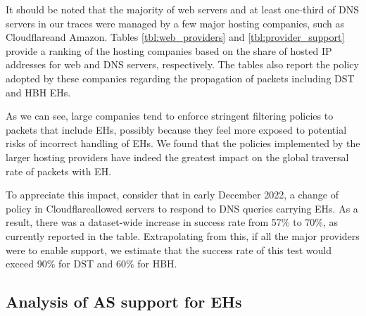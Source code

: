 \documentclass[conference]{IEEEtran}
\begin{document}

It should be noted that the  majority of web servers and at least one-third of
DNS servers in our traces were managed by a few major hosting companies, such
as Cloudflare\texttrademark and Amazon\texttrademark.  Tables
\ref{tbl:web_providers} and \ref{tbl:provider_support} provide a ranking of the
hosting companies based on the share of hosted IP addresses for web and DNS
servers, respectively. The tables also report the policy adopted by these
companies regarding the propagation of packets including DST and HBH EHs.  

As we can see, large companies tend to enforce stringent filtering policies to
packets that include EHs, possibly because they feel more exposed to potential
risks of incorrect handling of EHs.  We found that the policies implemented by
the larger hosting providers have indeed the greatest impact on the global
traversal rate of packets with EH. 



To appreciate this impact, consider that in early December 2022, a change of
policy in Cloudflare\texttrademark allowed servers to respond to DNS queries
carrying EHs.  As a result, there was a dataset-wide increase in success rate
from 57\% to 70\%, as currently reported in the table.  Extrapolating from
this, if all the major providers were to enable support, we estimate that the
success rate of this test would exceed 90\% for DST and 60\% for HBH.


\subsection{Analysis of AS support for EHs}
\end{document}
